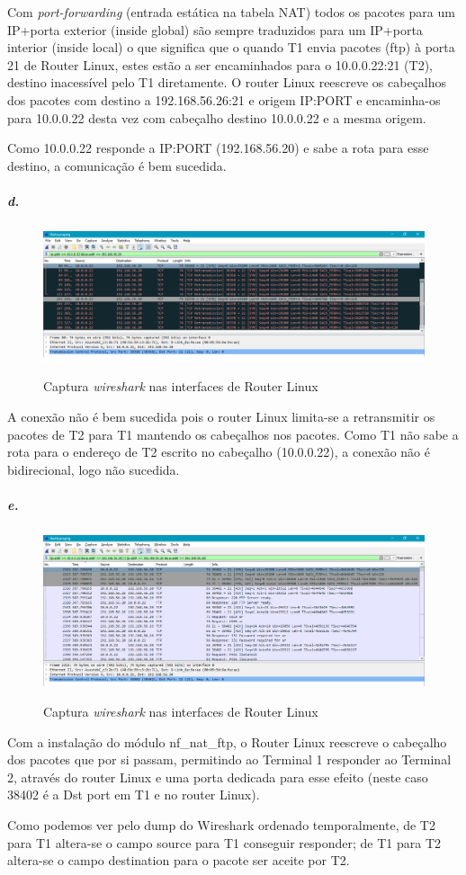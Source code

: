 Com \emph{port-forwarding} (entrada estática na tabela NAT) todos os
pacotes para um IP+porta exterior (inside global) são sempre
traduzidos para um IP+porta interior (inside local) o que significa
que o quando T1 envia pacotes (ftp) à porta 21 de Router Linux, estes
estão a ser encaminhados para o \textsf{10.0.0.22:21} (T2), destino
inacessível pelo T1 diretamente. O router Linux reescreve os
cabeçalhos dos pacotes com destino a 192.168.56.26:21 e origem IP:PORT
e encaminha-os para 10.0.0.22 desta vez com cabeçalho destino
10.0.0.22 e a mesma origem.


Como 10.0.0.22 responde a IP:PORT (192.168.56.20) e sabe a rota para
esse destino, a comunicação é bem sucedida.


\subparagraph{d.}

\begin{figure}[h]
\centering
\includegraphics[width=1\textwidth, height=0.3\textheight]{5d.png}
\label{fig:5d}
\caption{Captura \emph{wireshark} nas interfaces de Router Linux}
\end{figure}

A conexão não é bem sucedida pois o router Linux limita-se a
retransmitir os pacotes de T2 para T1 mantendo os cabeçalhos nos
pacotes. Como T1 não sabe a rota para o endereço de T2 escrito no
cabeçalho (10.0.0.22), a conexão não é bidirecional, logo não
sucedida.

\subparagraph{e.}

\begin{figure}[h]
\centering
\includegraphics[width=1\textwidth, height=0.3\textheight]{5e.png}
\label{fig:5e}
\caption{Captura \emph{wireshark} nas interfaces de Router Linux}
\end{figure}

Com a instalação do módulo \textsf{nf\_nat\_ftp}, o Router Linux
reescreve o cabeçalho dos pacotes que por si passam, permitindo ao
Terminal 1 responder ao Terminal 2, através do router Linux e uma
porta dedicada para esse efeito (neste caso 38402 é a Dst port em T1 e
no router Linux).

Como podemos ver pelo dump do Wireshark ordenado
temporalmente, de T2 para T1 altera-se o campo source para T1
conseguir responder; de T1 para T2 altera-se o campo destination para
o pacote ser aceite por T2.
